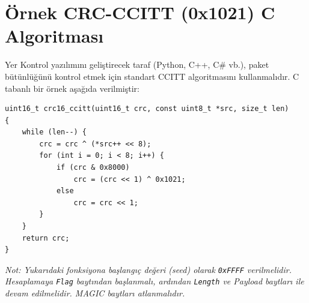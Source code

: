 \documentclass[a4paper,10pt]{article}
\newcommand{\hex}[1]{\texttt{0x#1}}
\newcommand{\code}[1]{\texttt{#1}}
\begin{document}
\section{Örnek CRC-CCITT (0x1021) C Algoritması}
Yer Kontrol yazılımını geliştirecek taraf (Python, C++, C\# vb.), paket bütünlüğünü kontrol etmek için standart CCITT algoritmasını kullanmalıdır. C tabanlı bir örnek aşağıda verilmiştir:

\begin{lstlisting}[style=cstyle]
uint16_t crc16_ccitt(uint16_t crc, const uint8_t *src, size_t len)
{
    while (len--) {
        crc = crc ^ (*src++ << 8);
        for (int i = 0; i < 8; i++) {
            if (crc & 0x8000)
                crc = (crc << 1) ^ 0x1021;
            else
                crc = crc << 1;
        }
    }
    return crc;
}
\end{lstlisting}
\textit{Not: Yukarıdaki fonksiyona başlangıç değeri (seed) olarak \hex{FFFF} verilmelidir. Hesaplamaya \code{Flag} baytından başlanmalı, ardından \code{Length} ve Payload baytları ile devam edilmelidir. MAGIC baytları atlanmalıdır.}
\end{document}
